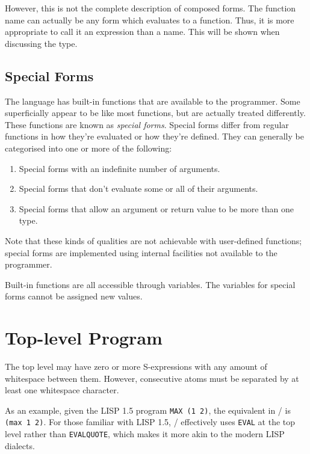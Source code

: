 \documentclass[a4paper, 12pt]{article}
\begin{document}
However, this is not the complete description of composed forms. The function name can actually be any form which evaluates to a function. Thus, it is more appropriate to call it an expression than a name. This will be shown when discussing the  type.

\subsection{Special Forms}
The language has built-in functions that are available to the programmer. Some superficially appear to be like most functions, but are actually treated differently. These functions are known as \textit{special forms}. Special forms differ from regular functions in how they're evaluated or how they're defined. They can generally be categorised into one or more of the following:

\begin{enumerate}
    \item Special forms with an indefinite number of arguments.
    \item Special forms that don't evaluate some or all of their arguments.
    \item Special forms that allow an argument or return value to be more than one type.
\end{enumerate}

Note that these kinds of qualities are not achievable with user-defined functions; special forms are implemented using internal facilities not available to the programmer.

Built-in functions are all accessible through variables. The variables for special forms cannot be assigned new values.

\section{Top-level Program}
The top level may have zero or more S-expressions with any amount of whitespace between them. However, consecutive atoms must be separated by at least one whitespace character.

As an example, given the LISP 1.5 program \texttt{MAX (1 2)}, the equivalent in \lispy/ is \texttt{(max 1 2)}. For those familiar with LISP 1.5, \lispy/ effectively uses \texttt{EVAL} at the top level rather than \texttt{EVALQUOTE}, which makes it more akin to the modern LISP dialects.
\end{document}
